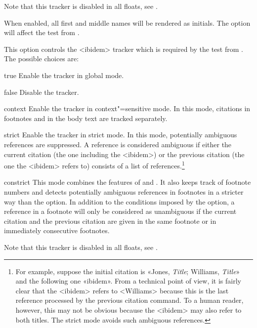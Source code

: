 \documentclass{ltxdockit}[2011/03/25]
\begin{document}
\begin{optionlist}
Note that this tracker is disabled in all floats, see .


When enabled, all first and middle names will be rendered as initials. The option will affect the  test from .


This option controls the <ibidem> tracker which is required by the  test from . The possible choices are:

\begin{valuelist}
\item[true] Enable the tracker in global mode.
\item[false] Disable the tracker.
\item[context] Enable the tracker in context"=sensitive mode. In this mode, citations in footnotes and in the body text are tracked separately.
\item[strict] Enable the tracker in strict mode. In this mode, potentially ambiguous references are suppressed. A reference is considered ambiguous if either the current citation (the one including the <ibidem>) or the previous citation (the one the <ibidem> refers to) consists of a list of references.\footnote{For example, suppose the initial citation is «Jones, \emph{Title}; Williams, \emph{Title}» and the following one «ibidem». From a technical point of view, it is fairly clear that the <ibidem> refers to <Williams> because this is the last reference processed by the previous citation command. To a human reader, however, this may not be obvious because the <ibidem> may also refer to both titles. The strict mode avoids such ambiguous references.}
\item[constrict] This mode combines the features of  and . It also keeps track of footnote numbers and detects potentially ambiguous references in footnotes in a stricter way than the  option. In addition to the conditions imposed by the  option, a reference in a footnote will only be considered as unambiguous if the current citation and the previous citation are given in the same footnote or in immediately consecutive footnotes.
\end{valuelist}

Note that this tracker is disabled in all floats, see .


\end{optionlist}
\end{document}
